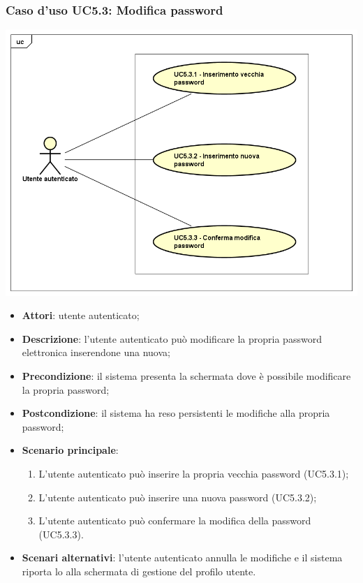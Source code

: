 \subsubsection{Caso d'uso UC5.3: Modifica password}
\begin{center}
	\includegraphics[scale=0.5]{UML/UC5_3.png}
\end{center}

\begin{itemize}
	\item \textbf{Attori}: utente autenticato;
	\item \textbf{Descrizione}: l'utente autenticato può modificare la propria password elettronica inserendone una nuova;
	\item \textbf{Precondizione}: il sistema presenta la schermata dove è possibile modificare la propria password;
	\item \textbf{Postcondizione}: il sistema ha reso persistenti le modifiche alla propria password;
	\item \textbf{Scenario principale}:
	\begin{enumerate}
		\item L'utente autenticato può inserire la propria vecchia password (UC5.3.1);
		\item L'utente autenticato può inserire una nuova password (UC5.3.2);
		\item L'utente autenticato può confermare la modifica della password (UC5.3.3).
	\end{enumerate}
	\item \textbf{Scenari alternativi}: l'utente autenticato annulla le modifiche e il sistema riporta lo alla schermata di gestione del profilo utente.
\end{itemize}

